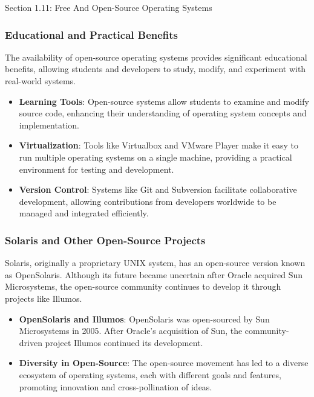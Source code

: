 \begin{notes}{Section 1.11: Free And Open-Source Operating Systems}
\begin{highlight}
    \end{highlight}
    
    \subsubsection*{Educational and Practical Benefits}
    
    The availability of open-source operating systems provides significant educational benefits, allowing students and developers to study, modify, and experiment with real-world systems.
    
    \begin{highlight}
    
    \begin{itemize}
        \item \textbf{Learning Tools}: Open-source systems allow students to examine and modify source code, enhancing their understanding of operating system concepts and implementation.
        \item \textbf{Virtualization}: Tools like Virtualbox and VMware Player make it easy to run multiple operating systems on a single machine, providing a practical environment for testing and development.
        \item \textbf{Version Control}: Systems like Git and Subversion facilitate collaborative development, allowing contributions from developers worldwide to be managed and integrated efficiently.
    \end{itemize}
    
    \end{highlight}
    
    \subsubsection*{Solaris and Other Open-Source Projects}
    
    Solaris, originally a proprietary UNIX system, has an open-source version known as OpenSolaris. Although its future became uncertain after Oracle acquired Sun Microsystems, the open-source community 
    continues to develop it through projects like Illumos.
    
    \begin{highlight}
    
    \begin{itemize}
        \item \textbf{OpenSolaris and Illumos}: OpenSolaris was open-sourced by Sun Microsystems in 2005. After Oracle's acquisition of Sun, the community-driven project Illumos continued its development.
        \item \textbf{Diversity in Open-Source}: The open-source movement has led to a diverse ecosystem of operating systems, each with different goals and features, promoting innovation and cross-pollination of ideas.
    \end{itemize}
    

\end{highlight}
\end{notes}
